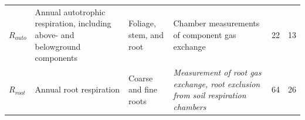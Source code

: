 \documentclass[]{article}
\begin{document}
\begin{longtable}[]{@{}llllll@{}}
\begin{minipage}[t]{0.14\columnwidth}\raggedright\strut
\(R_{auto}\)\strut
\end{minipage} & \begin{minipage}[t]{0.19\columnwidth}\raggedright\strut
Annual autotrophic respiration, including above- and belowground
components\strut
\end{minipage} & \begin{minipage}[t]{0.13\columnwidth}\raggedright\strut
Foliage, stem, and root\strut
\end{minipage} & \begin{minipage}[t]{0.23\columnwidth}\raggedright\strut
Chamber measurements of component gas exchange\strut
\end{minipage} & \begin{minipage}[t]{0.07\columnwidth}\raggedright\strut
22\strut
\end{minipage} & \begin{minipage}[t]{0.07\columnwidth}\raggedright\strut
13\strut
\end{minipage}\tabularnewline
\begin{minipage}[t]{0.14\columnwidth}\raggedright\strut
\(R_{root}\)\strut
\end{minipage} & \begin{minipage}[t]{0.19\columnwidth}\raggedright\strut
Annual root respiration\strut
\end{minipage} & \begin{minipage}[t]{0.13\columnwidth}\raggedright\strut
Coarse and fine roots\strut
\end{minipage} & \begin{minipage}[t]{0.23\columnwidth}\raggedright\strut
\emph{Measurement of root gas exchange, root exclusion from soil
respiration chambers}\strut
\end{minipage} & \begin{minipage}[t]{0.07\columnwidth}\raggedright\strut
64\strut
\end{minipage} & \begin{minipage}[t]{0.07\columnwidth}\raggedright\strut
26\strut
\end{minipage}\tabularnewline
\bottomrule
\end{longtable}
\end{document}
